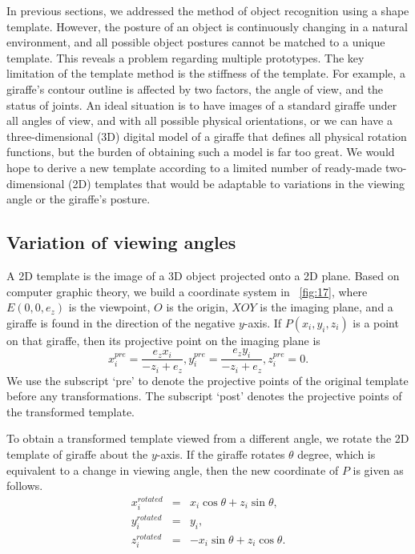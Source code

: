 \documentclass[journal]{IEEEtran}
\begin{document}
In previous sections, we addressed the method of object recognition using a shape template. 
However, the posture of an object is continuously changing in a natural environment, 
and all possible object postures cannot be matched to a unique template. 
This reveals a problem regarding multiple prototypes. 
The key limitation of the template method is the stiffness of the template. 
For example, a giraffe's contour outline is affected by two factors, 
the angle of view, and the status of joints. 
An ideal situation is to have images of a standard giraffe under all angles of view, 
and with all possible physical orientations, 
or we can have a three-dimensional (3D) digital model of a giraffe that defines all physical rotation functions, 
but the burden of obtaining such a model is far too great. 
We would hope to derive a new template according to a limited number of ready-made two-dimensional (2D) templates that would be adaptable to variations in the viewing angle or the giraffe's posture.

\subsection{Variation of viewing angles}

A 2D template is the image of a 3D object projected onto a 2D plane. 
Based on computer graphic theory, we build a coordinate system in \figurename~\ref{fig:17}, 
where $E(0,0,e_z)$ is the viewpoint, $O$ is the origin, $XOY$ is the imaging plane, 
and a giraffe is found in the direction of the negative $y$-axis.
If $P(x_i,y_i,z_i)$ is a point on that giraffe, 
then its projective point on the imaging plane is
\begin{equation}
x_i^{pre}=\frac{e_z x_i}{-z_i+e_z}, y_i^{pre}=\frac{e_z y_i}{-z_i+e_z}, z_i^{pre}=0.
\label{eqn:2}
\end{equation}
We use the subscript `pre' to denote the projective points of the original template before any transformations.
The subscript `post' denotes the projective points of the transformed template.

To obtain a transformed template viewed from a different angle,
we rotate the 2D template of giraffe about the $y$-axis.
If the giraffe rotates $\theta$ degree, which is equivalent to a change in viewing angle, 
then the new coordinate of $P$ is given as follows. 
\begin{eqnarray}
x_i^{rotated}&=&x_i \cos\theta+z_i \sin\theta, \nonumber\\
y_i^{rotated}&=&y_i, \nonumber\\
z_i^{rotated}&=&-x_i \sin\theta+z_i \cos\theta. 
\end{eqnarray}
\end{document}

